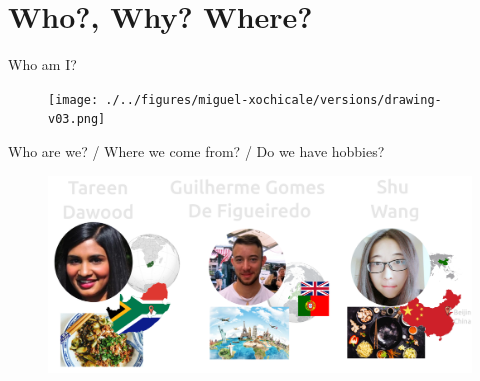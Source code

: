 \section{Who?, Why? Where?}



{
\begin{frame}{Who am I?}

  \begin{figure}
  \centering
  \texttt{[image: ./../figures/miguel-xochicale/versions/drawing-v03.png]}
  \end{figure}

\end{frame}
}



{
\begin{frame}{Who are we? / Where we come from? / Do we have hobbies?}

  \begin{figure}
  \centering
  \includegraphics[width=1.0\textwidth]{./../figures/who-we-are/versions/drawing-v07.png}
  \end{figure}

\end{frame}
}




